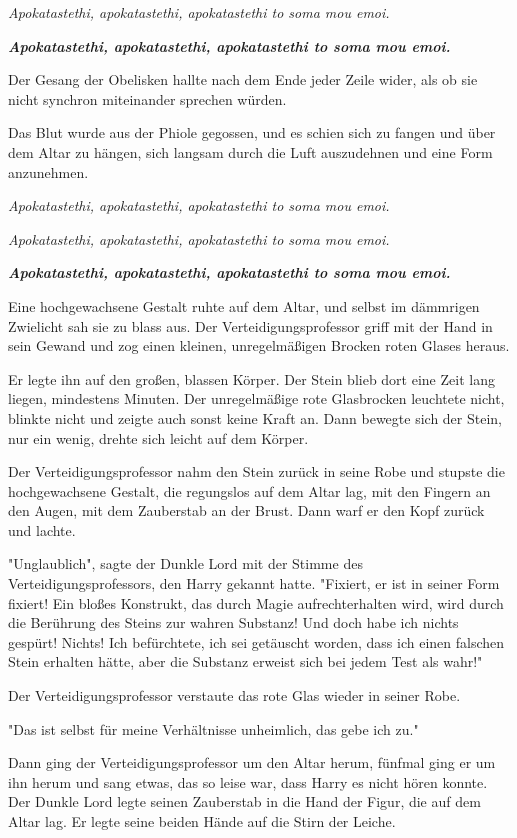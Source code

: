 {\emph{Apokatastethi, apokatastethi, apokatastethi to soma mou emoi.}

\textbf{\emph{Apokatastethi, apokatastethi, apokatastethi to soma mou emoi.}}

Der Gesang der Obelisken hallte nach dem Ende jeder Zeile wider, als ob sie nicht synchron miteinander sprechen würden.

Das Blut wurde aus der Phiole gegossen, und es schien sich zu fangen und über dem Altar zu hängen, sich langsam durch die Luft auszudehnen und eine Form anzunehmen.

\emph{Apokatastethi, apokatastethi, apokatastethi to soma mou emoi.}

\emph{Apokatastethi, apokatastethi, apokatastethi to soma mou emoi.}

\textbf{\emph{Apokatastethi, apokatastethi, apokatastethi to soma mou emoi.}}

Eine hochgewachsene Gestalt ruhte auf dem Altar, und selbst im dämmrigen Zwielicht sah sie zu blass aus. Der Verteidigungsprofessor griff mit der Hand in sein Gewand und zog einen kleinen, unregelmäßigen Brocken roten Glases heraus.

Er legte ihn auf den großen, blassen Körper. Der Stein blieb dort eine Zeit lang liegen, mindestens Minuten. Der unregelmäßige rote Glasbrocken leuchtete nicht, blinkte nicht und zeigte auch sonst keine Kraft an. Dann bewegte sich der Stein, nur ein wenig, drehte sich leicht auf dem Körper.

Der Verteidigungsprofessor nahm den Stein zurück in seine Robe und stupste die hochgewachsene Gestalt, die regungslos auf dem Altar lag, mit den Fingern an den Augen, mit dem Zauberstab an der Brust. Dann warf er den Kopf zurück und lachte.

"Unglaublich", sagte der Dunkle Lord mit der Stimme des Verteidigungsprofessors, den Harry gekannt hatte. "Fixiert, er ist in seiner Form fixiert! Ein bloßes Konstrukt, das durch Magie aufrechterhalten wird, wird durch die Berührung des Steins zur wahren Substanz! Und doch habe ich nichts gespürt! Nichts! Ich befürchtete, ich sei getäuscht worden, dass ich einen falschen Stein erhalten hätte, aber die Substanz erweist sich bei jedem Test als wahr!"

Der Verteidigungsprofessor verstaute das rote Glas wieder in seiner Robe.

"Das ist selbst für meine Verhältnisse unheimlich, das gebe ich zu."

Dann ging der Verteidigungsprofessor um den Altar herum, fünfmal ging er um ihn herum und sang etwas, das so leise war, dass Harry es nicht hören konnte. Der Dunkle Lord legte seinen Zauberstab in die Hand der Figur, die auf dem Altar lag. Er legte seine beiden Hände auf die Stirn der Leiche.

}
